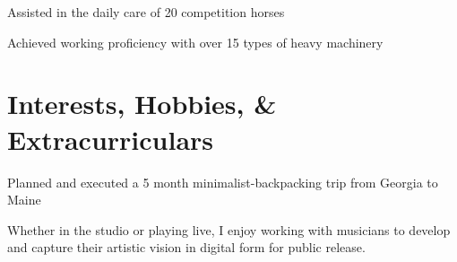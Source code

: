 \documentclass[letterpaper]{deedy-resume} %
\begin{document}
\begin{minipage}[t]{0.66\textwidth}
\sectionspace %



\begin{tightitemize}
\item Assisted in the daily care of 20 competition horses
\item Achieved working proficiency with over 15 types of heavy machinery
\end{tightitemize}

\sectionspace %


\section{Interests, Hobbies, \& Extracurriculars}


Planned and executed a 5 month minimalist-backpacking trip from Georgia to Maine

\sectionspace %



Whether in the studio or playing live, I enjoy working with musicians to develop and capture their artistic vision in digital form for public release.

\sectionspace %





\end{minipage}
\end{document}
